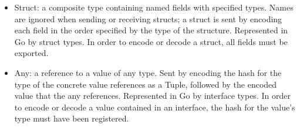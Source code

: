 \begin{itemize}
	\item Struct: a composite type containing named fields with specified types. Names are ignored when sending or receiving structs; a struct is sent by encoding each field in the order specified by the type of the structure. Represented in Go by struct types. In order to encode or decode a struct, all fields must be exported.
	
	\item Any: a reference to a value of any type. Sent by encoding the hash for the type of the concrete value references as a Tuple, followed by the encoded value that the any references. Represented in Go by interface types. In order to encode or decode a value contained in an interface, the hash for the value's type must have been registered.

\end{itemize}


